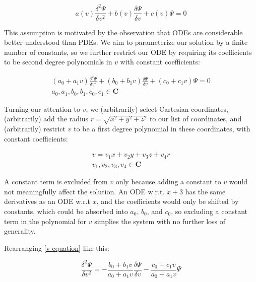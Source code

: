 \documentclass{article}
\begin{document}
\begin{equation}
a(v) \frac{\delta^2\Psi}{\delta v^2} + b(v) \frac{\delta\Psi}{\delta v} + c(v) \Psi = 0
\end{equation}

This assumption is motivated by the observation that ODEs are considerable better understood
than PDEs.  We aim to parameterize our solution by a finite number of constants, so we
further restrict our ODE by requiring its coefficients to be second degree polynomials in $v$
with constant coefficients:

\begin{equation}
\label{v equation}
\begin{gathered}
(a_0 + a_1 v) \frac{\delta^2\Psi}{\delta v^2} + (b_0 + b_1 v) \frac{\delta\Psi}{\delta v} + (c_0 + c_1 v) \Psi = 0 \\
a_0, a_1, b_0, b_1, c_0, c_1 \in \mathbf{C}
\end{gathered}
\end{equation}

Turning our attention to $v$, we (arbitrarily) select Cartesian coordinates, (arbitrarily) add the radius $r=\sqrt{x^2+y^2+z^2}$
to our list of coordinates, and (arbitrarily) restrict $v$ to be a first degree polynomial in these coordinates,
with constant coefficients:

\begin{equation}
\begin{gathered}
\label{v form}
v = v_1 x + v_2 y + v_3 z + v_4 r \\
v_1, v_2, v_3, v_4 \in \mathbf{C}
\end{gathered}
\end{equation}

A constant term is excluded from $v$ only because adding a constant to $v$ would not meaningfully affect the
solution.  An ODE w.r.t. $x+3$ has the same derivatives as an ODE w.r.t $x$, and the coefficients would
only be shifted by constants, which could be absorbed into $a_0$, $b_0$, and $c_0$, so excluding a constant term
in the polynomial for $v$ simplies the system with no further loss of generality.

Rearranging \eqref{v equation} like this:

\begin{equation}
\label{rearranged v equation}
\frac{\delta^2\Psi}{\delta v^2} = - \frac{b_0 + b_1 v}{a_0 + a_1 v} \frac{\delta\Psi}{\delta v} - \frac{c_0 + c_1 v}{a_0 + a_1 v}\Psi
\end{equation}
\end{document}
